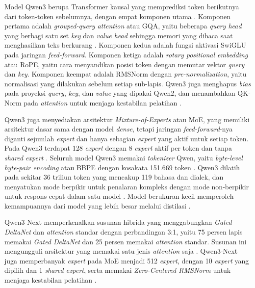 Model Qwen3 berupa Transformer kausal yang memprediksi token berikutnya dari token-token sebelumnya, dengan empat komponen utama \parencite{qwen2025a}.
Komponen pertama adalah \textit{grouped-query attention} atau GQA, yaitu beberapa \textit{query head} yang berbagi satu set \textit{key} dan \textit{value head} sehingga memori yang dibaca saat menghasilkan teks berkurang \parencite{ainslie2023}.
Komponen kedua adalah fungsi aktivasi SwiGLU pada jaringan \textit{feed-forward}.
Komponen ketiga adalah \textit{rotary positional embedding} atau RoPE, yaitu cara menyandikan posisi token dengan memutar vektor \textit{query} dan \textit{key}.
Komponen keempat adalah RMSNorm dengan \textit{pre-normalization}, yaitu normalisasi yang dilakukan sebelum setiap sub-lapis.
Qwen3 juga menghapus \textit{bias} pada proyeksi \textit{query}, \textit{key}, dan \textit{value} yang dipakai Qwen2, dan menambahkan QK-Norm pada \textit{attention} untuk menjaga kestabilan pelatihan \parencite{qwen2025a}.

Qwen3 juga menyediakan arsitektur \textit{Mixture-of-Experts} atau MoE, yang memiliki arsitektur dasar sama dengan model \textit{dense}, tetapi jaringan \textit{feed-forward}-nya diganti sejumlah \textit{expert} dan hanya sebagian \textit{expert} yang aktif untuk setiap token.
Pada Qwen3 terdapat 128 \textit{expert} dengan 8 \textit{expert} aktif per token dan tanpa \textit{shared expert} \parencite{qwen2025a}.
Seluruh model Qwen3 memakai \textit{tokenizer} Qwen, yaitu \textit{byte-level byte-pair encoding} atau BBPE dengan kosakata 151.669 token \parencite{qwen2025a}.
Qwen3 dilatih pada sekitar 36 triliun token yang mencakup 119 bahasa dan dialek, dan menyatukan mode berpikir untuk penalaran kompleks dengan mode non-berpikir untuk respons cepat dalam satu model \parencite{qwen2025a}.
Model berukuran kecil memperoleh kemampuannya dari model yang lebih besar melalui distilasi \parencite{qwen2025a}.

Qwen3-Next memperkenalkan susunan hibrida yang menggabungkan \textit{Gated DeltaNet} dan \textit{attention} standar dengan perbandingan 3:1, yaitu 75 persen lapis memakai \textit{Gated DeltaNet} dan 25 persen memakai \textit{attention} standar.
Susunan ini mengungguli arsitektur yang memakai satu jenis \textit{attention} saja \parencite{qwen2025b}.
Qwen3-Next juga memperbanyak \textit{expert} pada MoE menjadi 512 \textit{expert}, dengan 10 \textit{expert} yang dipilih dan 1 \textit{shared expert}, serta memakai \textit{Zero-Centered RMSNorm} untuk menjaga kestabilan pelatihan \parencite{qwen2025b}.

